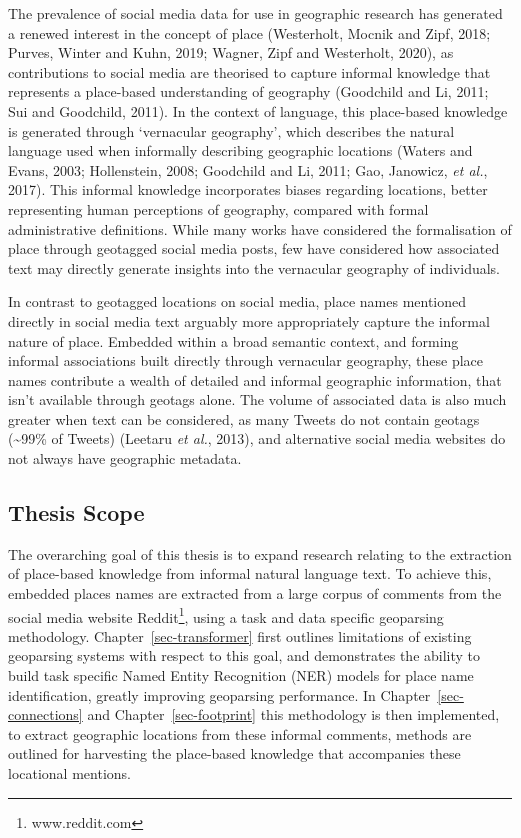 \documentclass[
  letterpaper,
  11pt,
  english,
  onehalfspacing,
  headsepline]{MastersDoctoralThesis}
\begin{document}
The prevalence of social media data for use in geographic research has
generated a renewed interest in the concept of place (Westerholt, Mocnik
and Zipf, 2018; Purves, Winter and Kuhn, 2019; Wagner, Zipf and
Westerholt, 2020), as contributions to social media are theorised to
capture informal knowledge that represents a place-based understanding
of geography (Goodchild and Li, 2011; Sui and Goodchild, 2011). In the
context of language, this place-based knowledge is generated through
`vernacular geography', which describes the natural language used when
informally describing geographic locations (Waters and Evans, 2003;
Hollenstein, 2008; Goodchild and Li, 2011; Gao, Janowicz, \emph{et al.},
2017). This informal knowledge incorporates biases regarding locations,
better representing human perceptions of geography, compared with formal
administrative definitions. While many works have considered the
formalisation of place through geotagged social media posts, few have
considered how associated text may directly generate insights into the
vernacular geography of individuals.

In contrast to geotagged locations on social media, place names
mentioned directly in social media text arguably more appropriately
capture the informal nature of place. Embedded within a broad semantic
context, and forming informal associations built directly through
vernacular geography, these place names contribute a wealth of detailed
and informal geographic information, that isn't available through
geotags alone. The volume of associated data is also much greater when
text can be considered, as many Tweets do not contain geotags
(\textasciitilde99\% of Tweets) (Leetaru \emph{et al.}, 2013), and
alternative social media websites do not always have geographic
metadata.

\hypertarget{thesis-scope}{%
\subsection{Thesis Scope}\label{thesis-scope}}

The overarching goal of this thesis is to expand research relating to
the extraction of place-based knowledge from informal natural language
text. To achieve this, embedded places names are extracted from a large
corpus of comments from the social media website Reddit\footnote{www.reddit.com},
using a task and data specific geoparsing methodology.
Chapter~\ref{sec-transformer} first outlines limitations of existing
geoparsing systems with respect to this goal, and demonstrates the
ability to build task specific Named Entity Recognition (NER) models for
place name identification, greatly improving geoparsing performance. In
Chapter~\ref{sec-connections} and Chapter~\ref{sec-footprint} this
methodology is then implemented, to extract geographic locations from
these informal comments, methods are outlined for harvesting the
place-based knowledge that accompanies these locational mentions.
\end{document}
